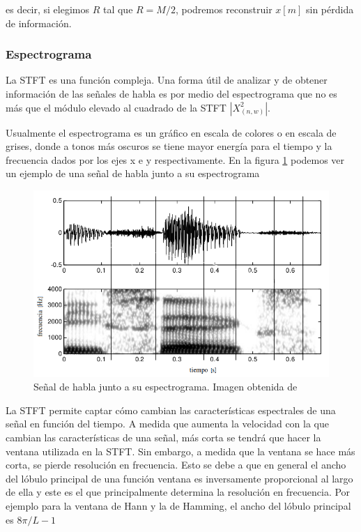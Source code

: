 es decir, si elegimos $R$ tal que $R = M/2$, podremos reconstruir $x[m]$ sin pérdida de información.

\subsubsection{Espectrograma}
\label{sec:espectrograma}

La STFT es una función compleja. Una forma útil de analizar y de obtener información de las señales de habla es por medio del espectrograma que no es más que el módulo elevado al cuadrado de la STFT $|X_{(n, w)}^2|$. 

Usualmente el espectrograma es un gráfico en escala de colores o en escala de grises, donde a tonos más oscuros se tiene mayor energía para el tiempo y la frecuencia dados por los ejes x e y respectivamente. En la figura \ref{fig:ch2_spectrogram} podemos ver un ejemplo de una señal de habla junto a su espectrograma

\begin{figure}[H]
	\centering
	\centerline{\includegraphics[scale=0.6]{images/ch2/spectrogram.png}}
	\caption{Señal de habla junto a su espectrograma. Imagen obtenida de \cite{spoken_language_processing}}
	\label{fig:ch2_spectrogram}
\end{figure}

La STFT permite captar cómo cambian las características espectrales de una señal en función del tiempo. A medida que aumenta la velocidad con la que cambian las características de una señal, más corta se tendrá que hacer la ventana utilizada en la STFT. Sin embargo, a medida que la ventana se hace más corta, se pierde resolución en frecuencia. Esto se debe a que en general el ancho del lóbulo principal de una función ventana es inversamente proporcional al largo de ella y este es el que principalmente determina la resolución en frecuencia.  Por ejemplo para la ventana de Hann y la de Hamming, el ancho del lóbulo principal es $8 \pi/L - 1$ \cite{oppenheim_schafer} 

